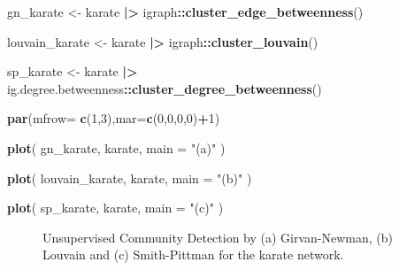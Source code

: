 \documentclass[10pt,a4paper,onecolumn]{article}
\newenvironment{Shaded}{\begin{snugshade}}{\end{snugshade}}
\newcommand{\AttributeTok}[1]{\textcolor[rgb]{0.13,0.29,0.53}{#1}}
\newcommand{\DecValTok}[1]{\textcolor[rgb]{0.00,0.00,0.81}{#1}}
\newcommand{\FunctionTok}[1]{\textcolor[rgb]{0.13,0.29,0.53}{\textbf{#1}}}
\newcommand{\NormalTok}[1]{#1}
\newcommand{\OtherTok}[1]{\textcolor[rgb]{0.56,0.35,0.01}{#1}}
\newcommand{\SpecialCharTok}[1]{\textcolor[rgb]{0.81,0.36,0.00}{\textbf{#1}}}
\newcommand{\StringTok}[1]{\textcolor[rgb]{0.31,0.60,0.02}{#1}}
\begin{document}
\begin{Shaded}
\begin{Highlighting}[]
\NormalTok{gn\_karate }\OtherTok{\textless{}{-}}\NormalTok{ karate }\SpecialCharTok{|\textgreater{}}
\NormalTok{  igraph}\SpecialCharTok{::}\FunctionTok{cluster\_edge\_betweenness}\NormalTok{()}

\NormalTok{louvain\_karate }\OtherTok{\textless{}{-}}\NormalTok{ karate }\SpecialCharTok{|\textgreater{}}
\NormalTok{  igraph}\SpecialCharTok{::}\FunctionTok{cluster\_louvain}\NormalTok{()}

\NormalTok{sp\_karate }\OtherTok{\textless{}{-}}\NormalTok{ karate }\SpecialCharTok{|\textgreater{}}
\NormalTok{  ig.degree.betweenness}\SpecialCharTok{::}\FunctionTok{cluster\_degree\_betweenness}\NormalTok{()}

\FunctionTok{par}\NormalTok{(}\AttributeTok{mfrow=} \FunctionTok{c}\NormalTok{(}\DecValTok{1}\NormalTok{,}\DecValTok{3}\NormalTok{),}\AttributeTok{mar=}\FunctionTok{c}\NormalTok{(}\DecValTok{0}\NormalTok{,}\DecValTok{0}\NormalTok{,}\DecValTok{0}\NormalTok{,}\DecValTok{0}\NormalTok{)}\SpecialCharTok{+}\DecValTok{1}\NormalTok{)}

\FunctionTok{plot}\NormalTok{(}
\NormalTok{  gn\_karate,}
\NormalTok{  karate,}
  \AttributeTok{main =} \StringTok{"(a)"}
\NormalTok{  )}

\FunctionTok{plot}\NormalTok{(}
\NormalTok{  louvain\_karate,}
\NormalTok{  karate,}
  \AttributeTok{main =} \StringTok{"(b)"}
\NormalTok{)}

\FunctionTok{plot}\NormalTok{(}
\NormalTok{  sp\_karate,}
\NormalTok{  karate,}
  \AttributeTok{main =} \StringTok{"(c)"}
\NormalTok{)}
\end{Highlighting}
\end{Shaded}

\begin{figure}
\centering
{}
\caption{Unsupervised Community Detection by (a) Girvan-Newman, (b)
Louvain and (c) Smith-Pittman for the karate network.}
\end{figure}
\end{document}
